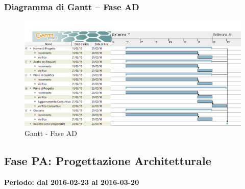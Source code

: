 \documentclass[../PianoProgetto.tex]{subfiles}
\begin{document}
		\subsubsection{Diagramma di Gantt – Fase AD}
			\begin{figure}[!h]
				\centering
				\includegraphics[width=\textwidth]{gantt_png/2-analisi_di_dettaglio}
				\caption{Gantt - Fase AD}
				\label{fig:Gantt - Fase AD}
			\end{figure}

	\subsection{Fase PA: Progettazione Architetturale}
		\textbf{Periodo: dal 2016-02-23 al 2016-03-20}
		
\end{document}
